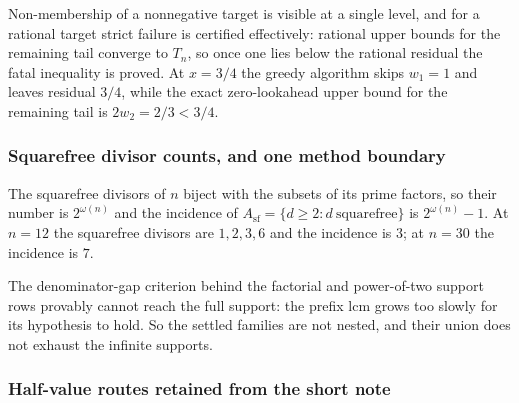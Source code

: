 \begin{obs}
Non-membership of a nonnegative target is visible at a single level, and for
a rational target strict failure is certified effectively: rational upper
bounds for the remaining tail converge to $T_n$, so once one lies below the
rational residual the fatal inequality is proved.  At $x=3/4$ the greedy
algorithm skips $w_1=1$ and leaves residual $3/4$, while the exact
zero-lookahead upper bound for the remaining tail is $2w_2=2/3<3/4$.
\par\noindent{}  
\end{obs}

\subsubsection*{Squarefree divisor counts, and one method boundary}

\begin{obs}
The squarefree divisors of $n$ biject with the subsets of its prime factors,
so their number is $2^{\omega(n)}$ and the incidence of
$A_{\mathrm{sf}}=\{d\ge2:d\ \text{squarefree}\}$ is $2^{\omega(n)}-1$.  At
$n=12$ the squarefree divisors are $1,2,3,6$ and the incidence is $3$; at
$n=30$ the incidence is $7$.
\par\noindent{}  
\end{obs}

\begin{obs}
The denominator-gap criterion behind the factorial and power-of-two support
rows provably cannot reach the full support: the prefix lcm grows too slowly
for its hypothesis to hold.  So the settled families are not nested, and their
union does not exhaust the infinite supports.
\par\noindent{}  
\end{obs}

\subsubsection*{Half-value routes retained from the short note}

